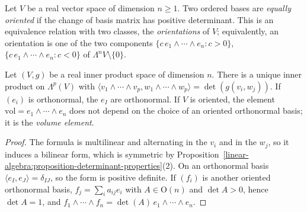 \begin{definition}\label{multilinear-algebra:definition-orientation}
Let $V$ be a real vector space of dimension $n \geq 1$. Two ordered bases are \emph{equally oriented} if the
change of basis matrix has positive determinant. This is an equivalence relation with two classes, the
\emph{orientations} of $V$; equivalently, an orientation is one of the two components
$\{c\,e_1 \wedge \cdots \wedge e_n : c > 0\}$, $\{c\,e_1 \wedge \cdots \wedge e_n : c < 0\}$ of $\Lambda^n V \setminus \{0\}$.
\end{definition}

\begin{proposition}\label{multilinear-algebra:proposition-induced-inner-product}
Let $(V, g)$ be a real inner product space of dimension $n$. There is a unique inner product on $\Lambda^p(V)$
with $\langle v_1 \wedge \cdots \wedge v_p, w_1 \wedge \cdots \wedge w_p \rangle = \det(g(v_i, w_j))$. If $(e_i)$ is orthonormal, the $e_I$
are orthonormal. If $V$ is oriented, the element $\mathrm{vol} = e_1 \wedge \cdots \wedge e_n$ does not depend on the choice
of an oriented orthonormal basis; it is the \emph{volume element}.
\end{proposition}

\begin{proof}
The formula is multilinear and alternating in the $v_i$ and in the $w_j$, so it induces a bilinear form, which is
symmetric by Proposition~\ref{linear-algebra:proposition-determinant-properties}(2). On an orthonormal basis
$\langle e_I, e_J \rangle = \delta_{IJ}$, so the form is positive definite. If $(f_i)$ is another oriented orthonormal basis,
$f_j = \sum_i a_{ij}e_i$ with $A \in \mathrm{O}(n)$ and $\det A > 0$, hence $\det A = 1$, and
$f_1 \wedge \cdots \wedge f_n = \det(A)\, e_1 \wedge \cdots \wedge e_n$.
\end{proof}

